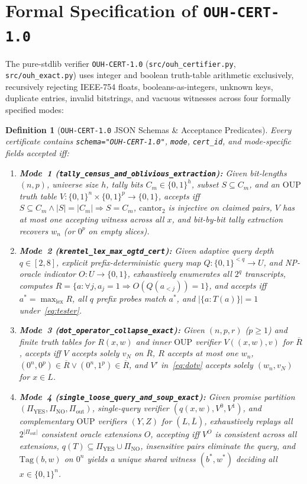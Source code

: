 \documentclass[10pt,twocolumn]{article}
\newtheorem{definition}{Definition}
\newcommand{\OUP}{\mathrm{OUP}}
\begin{document}
\section{Formal Specification of \texttt{OUH-CERT-1.0}}\label{sec:certifier}
The pure-stdlib verifier \texttt{OUH-CERT-1.0} (\texttt{src/ouh\_certifier.py}, \texttt{src/ouh\_exact.py}) uses integer and boolean truth-table arithmetic exclusively, recursively rejecting IEEE-754 floats, booleans-as-integers, unknown keys, duplicate entries, invalid bitstrings, and vacuous witnesses across four formally specified modes:

\begin{definition}[\texttt{OUH-CERT-1.0} JSON Schemas \& Acceptance Predicates]\label{def:ouhcert}
Every certificate contains \texttt{schema="OUH-CERT-1.0"}, \texttt{mode}, \texttt{cert\_id}, and mode-specific fields accepted iff:
\begin{enumerate}[leftmargin=*,nosep]
  \item \textbf{Mode~1 (\texttt{tally\_census\_and\_oblivious\_extraction}):} Given bit-lengths $(n, p)$, universe size $h$, tally bits $C_m \in \{0,1\}^h$, subset $S \subseteq C_m$, and an $\OUP$ truth table $V : \{0,1\}^n \times \{0,1\}^p \to \{0,1\}$, accepts iff $S \subseteq C_m \land |S| = |C_m| \Rightarrow S = C_m$, $\mathrm{cantor}_2$ is injective on claimed pairs, $V$ has at most one accepting witness across all $x$, and bit-by-bit tally extraction recovers $w_n$ (or $0^p$ on empty slices).
  \item \textbf{Mode~2 (\texttt{krentel\_lex\_max\_ogtd\_cert}):} Given adaptive query depth $q \in [2, 8]$, explicit prefix-deterministic query map $Q : \{0,1\}^{<q} \to U$, and NP-oracle indicator $O : U \to \{0,1\}$, exhaustively enumerates all $2^q$ transcripts, computes $R = \{a : \forall j, a_j=1 \Rightarrow O(Q(a_{<j}))=1\}$, and accepts iff $a^\ast = \max_{\mathrm{lex}} R$, all $q$ prefix probes match $a^\ast$, and $|\{a : T(a)\}| = 1$ under~\eqref{eq:tester}.
  \item \textbf{Mode~3 (\texttt{dot\_operator\_collapse\_exact}):} Given $(n, p, r)$ ($p \ge 1$) and finite truth tables for $R(x,w)$ and inner $\OUP$ verifier $V((x,w), v)$ for $\overline{R}$, accepts iff $V$ accepts solely $v_N$ on $\overline{R}$, $R$ accepts at most one $w_n$, $(0^n,0^p) \in \overline{R} \lor (0^n,1^p) \in \overline{R}$, and $V'$ in~\eqref{eq:dotv} accepts solely $(w_n, v_N)$ for $x \in L$.
  \item \textbf{Mode~4 (\texttt{single\_loose\_query\_and\_soup\_exact}):} Given promise partition $(\Pi_{\mathrm{YES}}, \Pi_{\mathrm{NO}}, \Pi_{\mathrm{out}})$, single-query verifier $(q(x,w), V^0, V^1)$, and complementary $\OUP$ verifiers $(Y, Z)$ for $(L, \overline{L})$, exhaustively replays all $2^{|\Pi_{\mathrm{out}}|}$ consistent oracle extensions $O$, accepting iff $V^O$ is consistent across all extensions, $q(T) \subseteq \Pi_{\mathrm{YES}} \cup \Pi_{\mathrm{NO}}$, insensitive pairs eliminate the query, and $\mathrm{Tag}(b, w)$ on $0^n$ yields a unique shared witness $(b^\ast, w^\ast)$ deciding all $x \in \{0,1\}^n$.
\end{enumerate}
\end{definition}
\end{document}
